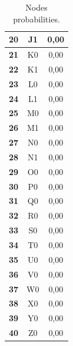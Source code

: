 \documentclass{article}
\begin{document}
\begin{table}[!ht]
\begin{tabular}{c||c|c|}
\multicolumn{1}{|c||}{\cellcolor{gray90}\textbf{20}} & J1 & 0,00 \\ \hline
\multicolumn{1}{|c||}{\cellcolor{gray90}\textbf{21}} & K0 & 0,00 \\ \hline
\multicolumn{1}{|c||}{\cellcolor{gray90}\textbf{22}} & K1 & 0,00 \\ \hline
\multicolumn{1}{|c||}{\cellcolor{gray90}\textbf{23}} & L0 & 0,00 \\ \hline
\multicolumn{1}{|c||}{\cellcolor{gray90}\textbf{24}} & L1 & 0,00 \\ \hline
\multicolumn{1}{|c||}{\cellcolor{gray90}\textbf{25}} & M0 & 0,00 \\ \hline
\multicolumn{1}{|c||}{\cellcolor{gray90}\textbf{26}} & M1 & 0,00 \\ \hline
\multicolumn{1}{|c||}{\cellcolor{gray90}\textbf{27}} & N0 & 0,00 \\ \hline
\multicolumn{1}{|c||}{\cellcolor{gray90}\textbf{28}} & N1 & 0,00 \\ \hline
\multicolumn{1}{|c||}{\cellcolor{gray90}\textbf{29}} & O0 & 0,00 \\ \hline
\multicolumn{1}{|c||}{\cellcolor{gray90}\textbf{30}} & P0 & 0,00 \\ \hline
\multicolumn{1}{|c||}{\cellcolor{gray90}\textbf{31}} & Q0 & 0,00 \\ \hline
\multicolumn{1}{|c||}{\cellcolor{gray90}\textbf{32}} & R0 & 0,00 \\ \hline
\multicolumn{1}{|c||}{\cellcolor{gray90}\textbf{33}} & S0 & 0,00 \\ \hline
\multicolumn{1}{|c||}{\cellcolor{gray90}\textbf{34}} & T0 & 0,00 \\ \hline
\multicolumn{1}{|c||}{\cellcolor{gray90}\textbf{35}} & U0 & 0,00 \\ \hline
\multicolumn{1}{|c||}{\cellcolor{gray90}\textbf{36}} & V0 & 0,00 \\ \hline
\multicolumn{1}{|c||}{\cellcolor{gray90}\textbf{37}} & W0 & 0,00 \\ \hline
\multicolumn{1}{|c||}{\cellcolor{gray90}\textbf{38}} & X0 & 0,00 \\ \hline
\multicolumn{1}{|c||}{\cellcolor{gray90}\textbf{39}} & Y0 & 0,00 \\ \hline
\multicolumn{1}{|c||}{\cellcolor{gray90}\textbf{40}} & Z0 & 0,00 \\ \hline
\end{tabular}
\caption{Nodes probabilities.}
\end{table}

\newpage
\newpage
\tableofcontents
\newpage
\end{document}
